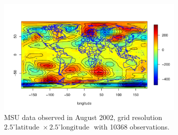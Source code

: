 
\begin{figure}[H]
\label{MSU_data}
\centering
\includegraphics [width=0.8\textwidth, keepaspectratio]{graphs/MSU_data.pdf}
\caption[MSU Data Observed in August 2002, Grid Resolution $2.5^\circ\mbox{Latitude }$]{MSU data observed in August 2002, grid resolution $2.5^\circ \mbox{latitude } \times 2.5^\circ \mbox{longitude }$ with 10368 observations.}
\end{figure}

\vfill


